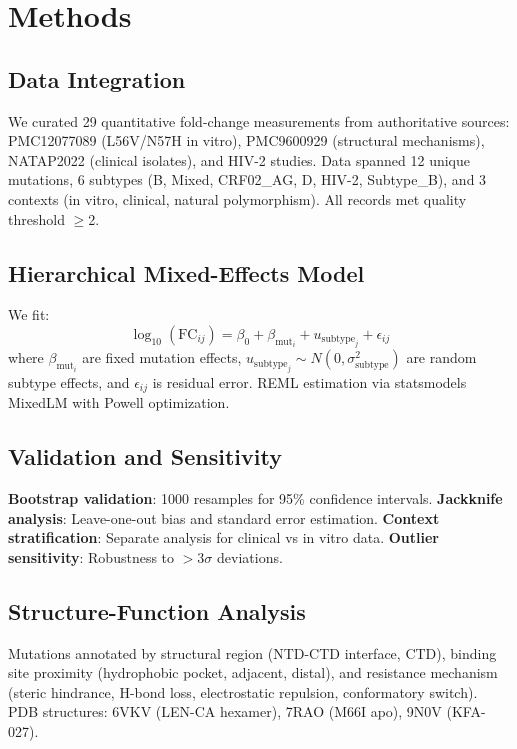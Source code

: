 \documentclass[11pt]{article}
\begin{document}
\section{Methods}

\subsection{Data Integration}
We curated 29 quantitative fold-change measurements from authoritative sources: PMC12077089 (L56V/N57H in vitro), PMC9600929 (structural mechanisms), NATAP2022 (clinical isolates), and HIV-2 studies. Data spanned 12 unique mutations, 6 subtypes (B, Mixed, CRF02\_AG, D, HIV-2, Subtype\_B), and 3 contexts (in vitro, clinical, natural polymorphism). All records met quality threshold $\geq$2.

\subsection{Hierarchical Mixed-Effects Model}
We fit:
\begin{equation}
\log_{10}(\text{FC}_{ij}) = \beta_0 + \beta_{\text{mut}_i} + u_{\text{subtype}_j} + \epsilon_{ij}
\end{equation}
where $\beta_{\text{mut}_i}$ are fixed mutation effects, $u_{\text{subtype}_j} \sim N(0, \sigma^2_{\text{subtype}})$ are random subtype effects, and $\epsilon_{ij}$ is residual error. REML estimation via statsmodels MixedLM with Powell optimization.

\subsection{Validation and Sensitivity}
\textbf{Bootstrap validation}: 1000 resamples for 95\% confidence intervals. \textbf{Jackknife analysis}: Leave-one-out bias and standard error estimation. \textbf{Context stratification}: Separate analysis for clinical vs in vitro data. \textbf{Outlier sensitivity}: Robustness to $>3\sigma$ deviations.

\subsection{Structure-Function Analysis}
Mutations annotated by structural region (NTD-CTD interface, CTD), binding site proximity (hydrophobic pocket, adjacent, distal), and resistance mechanism (steric hindrance, H-bond loss, electrostatic repulsion, conformatory switch). PDB structures: 6VKV (LEN-CA hexamer), 7RAO (M66I apo), 9N0V (KFA-027).
\end{document}
